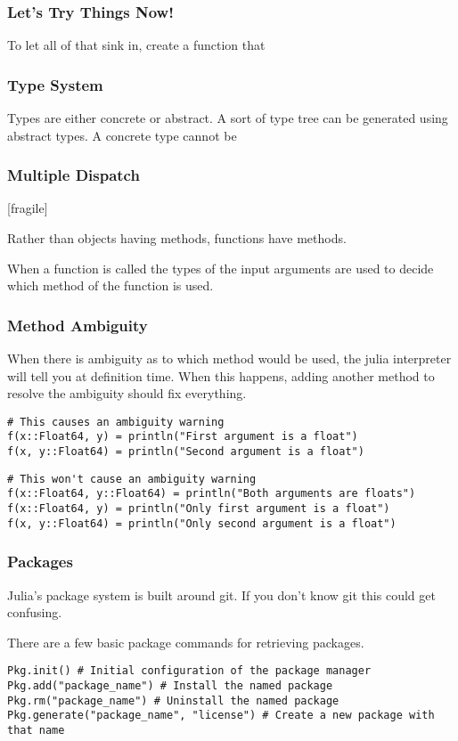 \documentclass{beamer}
\begin{document}
\begin{frame}
\frametitle{Let's Try Things Now!}
To let all of that sink in, create a function that 
\end{frame}

\begin{frame}
\frametitle{Type System}

Types are either concrete or abstract. A sort of type tree can be generated
using abstract types. A concrete type cannot be 

\end{frame}

\begin{frame}
\frametitle{Multiple Dispatch}[fragile]

Rather than objects having methods, functions have methods.

When a function is called the types of the input arguments are used to decide 
which method of the function is used.

\end{frame}

\begin{frame}[fragile]
\frametitle{Method Ambiguity}

When there is ambiguity as to which method would be used, the julia interpreter
will tell you at definition time. When this happens, adding another method to 
resolve the ambiguity should fix everything.

\begin{verbatim}
# This causes an ambiguity warning
f(x::Float64, y) = println("First argument is a float")
f(x, y::Float64) = println("Second argument is a float")
\end{verbatim}

\begin{verbatim}
# This won't cause an ambiguity warning
f(x::Float64, y::Float64) = println("Both arguments are floats")
f(x::Float64, y) = println("Only first argument is a float")
f(x, y::Float64) = println("Only second argument is a float")
\end{verbatim}
\end{frame}

\begin{frame}
\frametitle{Packages}

Julia's package system is built around git. If you don't know git this could 
get confusing.

There are a few basic package commands for retrieving packages.
\begin{verbatim}
Pkg.init() # Initial configuration of the package manager
Pkg.add("package_name") # Install the named package
Pkg.rm("package_name") # Uninstall the named package
Pkg.generate("package_name", "license") # Create a new package with that name
\end{verbatim}

\end{frame}
\end{document}
